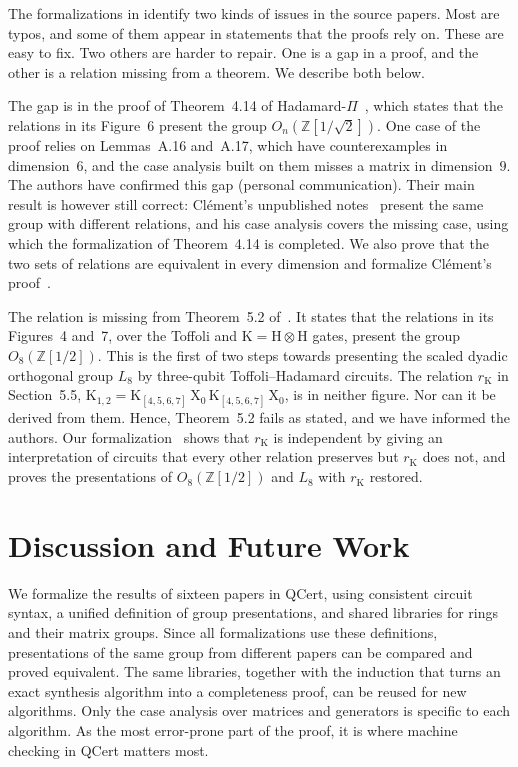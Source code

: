 \documentclass[acmsmall,nonacm,11pt,screen]{acmart}
\newcommand{\Z}{\mathbb{Z}}
\begin{document}
The formalizations in  identify two kinds of issues in the source papers. Most are typos, and some of them appear in statements that the proofs rely on. These are easy to fix. Two others are harder to repair. One is a gap in a proof, and the other is a relation missing from a theorem. We describe both below.

The gap is in the proof of Theorem~4.14 of Hadamard-$\Pi$~\cite{fang2026hadamard}, which states that the relations in its Figure~6 present the group $O_n\left(\Z\left[1/\sqrt2\right]\right)$. One case of the proof relies on Lemmas~A.16 and~A.17, which have counterexamples in dimension~$6$, and the case analysis built on them misses a matrix in dimension~$9$. The authors have confirmed this gap (personal communication). 
Their main result is however still correct: Cl\'ement's unpublished notes~\cite{clement2019thesis} present the same group with different relations, and his case analysis covers the missing case, using which the formalization of Theorem~4.14 is completed. We also prove that the two sets of relations are equivalent in every dimension and formalize Cl\'ement's proof~\cite{qcert2026clement}.

The relation is missing from Theorem~5.2 of~\cite{amy2024toffoli}. It states that the relations in its Figures~4 and~7, over the Toffoli and $\mathrm{K} = \mathrm{H}\otimes\mathrm{H}$ gates, present the group $O_8\left(\Z\left[1/2\right]\right)$. This is the first of two steps towards presenting the scaled dyadic orthogonal group $L_8$ by three-qubit Toffoli--Hadamard circuits. The relation $r_{\mathrm{K}}$ in Section~5.5, $\mathrm{K}_{1,2} = \mathrm{K}_{[4,5,6,7]}\,\mathrm{X}_0\,\mathrm{K}_{[4,5,6,7]}\,\mathrm{X}_0$, is in neither figure. Nor can it be derived from them. Hence, Theorem~5.2 fails as stated, and we have informed the authors. Our formalization~\cite{qcert2026toffoli} shows that $r_{\mathrm{K}}$ is independent by giving an interpretation of circuits that every other relation preserves but $r_{\mathrm{K}}$ does not, and proves the presentations of $O_8\left(\Z\left[1/2\right]\right)$ and $L_8$ with $r_{\mathrm{K}}$ restored.

\section{Discussion and Future Work}\label{sec:conclusion}

We formalize the results of sixteen papers in QCert, using consistent circuit syntax, a unified definition of group presentations, and shared libraries for rings and their matrix groups. Since all formalizations use these definitions, presentations of the same group from different papers can be compared and proved equivalent. The same libraries, together with the induction that turns an exact synthesis algorithm into a completeness proof, can be reused for new algorithms. Only the case analysis over matrices and generators is specific to each algorithm. As the most error-prone part of the proof, it is where machine checking in QCert matters most.
\end{document}
